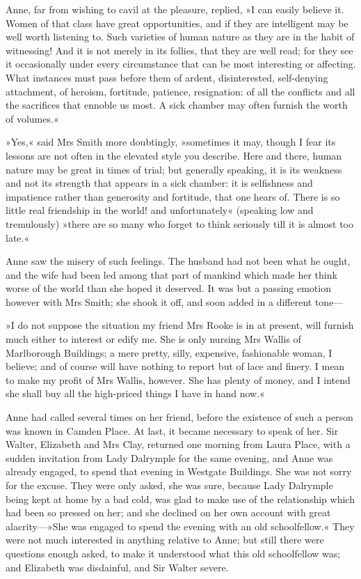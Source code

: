 Anne, far from wishing to cavil at the pleasure, replied, »I can easily believe it. Women of that class have great opportunities, and if they are intelligent may be well worth listening to. Such varieties of human nature as they are in the habit of witnessing! And it is not merely in its follies, that they are well read; for they see it occasionally under every circumstance that can be most interesting or affecting. What instances must pass before them of ardent, disinterested, self-denying attachment, of heroism, fortitude, patience, resignation: of all the conflicts and all the sacrifices that ennoble us most. A sick chamber may often furnish the worth of volumes.«

»Yes,« said Mrs Smith more doubtingly, »sometimes it may, though I fear its lessons are not often in the elevated style you describe. Here and there, human nature may be great in times of trial; but generally speaking, it is its weakness and not its strength that appears in a sick chamber: it is selfishness and impatience rather than generosity and fortitude, that one hears of. There is so little real friendship in the world! and unfortunately« (speaking low and tremulously) »there are so many who forget to think seriously till it is almost too late.«

Anne saw the misery of such feelings. The husband had not been what he ought, and the wife had been led among that part of mankind which made her think worse of the world than she hoped it deserved. It was but a passing emotion however with Mrs Smith; she shook it off, and soon added in a different tone—

»I do not suppose the situation my friend Mrs Rooke is in at present, will furnish much either to interest or edify me. She is only nursing Mrs Wallis of Marlborough Buildings; a mere pretty, silly, expensive, fashionable woman, I believe; and of course will have nothing to report but of lace and finery. I mean to make my profit of Mrs Wallis, however. She has plenty of money, and I intend she shall buy all the high-priced things I have in hand now.«

Anne had called several times on her friend, before the existence of such a person was known in Camden Place. At last, it became necessary to speak of her. Sir Walter, Elizabeth and Mrs Clay, returned one morning from Laura Place, with a sudden invitation from Lady Dalrymple for the same evening, and Anne was already engaged, to spend that evening in Westgate Buildings. She was not sorry for the excuse. They were only asked, she was sure, because Lady Dalrymple being kept at home by a bad cold, was glad to make use of the relationship which had been so pressed on her; and she declined on her own account with great alacrity—»She was engaged to spend the evening with an old schoolfellow.« They were not much interested in anything relative to Anne; but still there were questions enough asked, to make it understood what this old schoolfellow was; and Elizabeth was disdainful, and Sir Walter severe.

